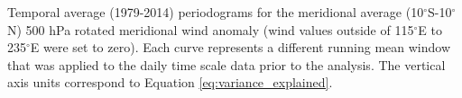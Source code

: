 \label{fig:periodogram}
Temporal average (1979-2014) periodograms for the meridional average (10$^{\circ}$S-10$^{\circ}$N) 500 hPa rotated meridional wind anomaly (wind values outside of 115$^{\circ}$E to 235$^{\circ}$E were set to zero). Each curve represents a different running mean window that was applied to the daily time scale data prior to the analysis. The vertical axis units correspond to Equation \ref{eq:variance_explained}.